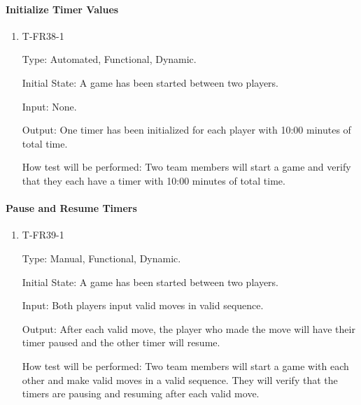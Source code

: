 \documentclass[12pt, titlepage]{article}
\begin{document}
    \paragraph{Initialize Timer Values}

        \begin{enumerate}

        \item{T-FR38-1\\}

            Type: Automated, Functional, Dynamic.
            					
            Initial State: A game has been started between two players.
            					
            Input: None.
            					
            Output: One timer has been initialized for each player with 10:00 minutes of total time.

            How test will be performed: Two team members will start a game and verify that they each have a timer with 10:00 minutes of total time.

        \end{enumerate}
        
    \paragraph{Pause and Resume Timers}

        \begin{enumerate}

        \item{T-FR39-1\\}

            Type: Manual, Functional, Dynamic.
            					
            Initial State: A game has been started between two players.
            					
            Input: Both players input valid moves in valid sequence.
            					
            Output: After each valid move, the player who made the move will have their timer paused and the other timer will resume.

            How test will be performed: Two team members will start a game with each other and make valid moves in a valid sequence. They will verify that the timers are pausing and resuming after each valid move.

        \end{enumerate}
\end{document}

